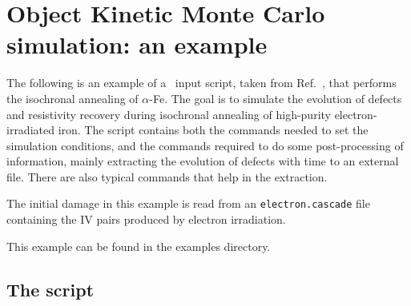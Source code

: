 \section{Object Kinetic Monte Carlo simulation: an example}

The following is an example of a \MMonCa\ input script, taken from Ref.~\cite{MARTIN-BRAGADO-CPC13}, that performs the isochronal annealing of $\alpha$-Fe. The goal is to simulate the evolution of defects and resistivity recovery during isochronal annealing of high-purity electron-irradiated iron. The script contains both the commands needed to set the simulation conditions, and the commands required to do some post-processing of information, mainly extracting the evolution of defects with time to an external file. There are also typical  commands that help in the extraction. 

The initial damage in this example is read from an {\tt electron.cascade} file containing the IV pairs produced by electron irradiation.

This example can be found in the {\param examples} directory.

\subsection{The script}


